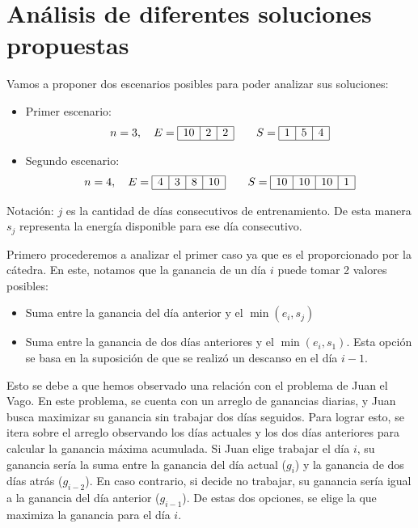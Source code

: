 \section{Análisis de diferentes soluciones propuestas}

Vamos a proponer dos escenarios posibles para poder analizar sus soluciones:

\begin{itemize}
    \item Primer escenario:
    $$
    n = 3,\quad
    E=
    \begin{array}{|c|c|c|}
        \hline 
        10 & 2 & 2\\
        \hline 
    \end{array}
    \qquad
    S=
    \begin{array}{|c|c|c|}
        \hline 
        1 & 5 & 4\\
        \hline 
    \end{array}
    $$

    \item Segundo escenario:
    $$
    n = 4,\quad
    E=
    \begin{array}{|c|c|c|c|}
        \hline 
        4 & 3 & 8 & 10\\
        \hline 
    \end{array}
    \qquad
    S=
    \begin{array}{|c|c|c|c|}
        \hline 
        10 & 10 & 10 & 1\\
        \hline 
    \end{array}
    $$
\end{itemize}

Notación: $j$ es la cantidad de días consecutivos de entrenamiento.
De esta manera $s_j$ representa la energía disponible para ese día consecutivo.

Primero procederemos a analizar el primer caso ya que es el proporcionado por la cátedra. En este,
notamos que la ganancia de un día $i$ puede tomar 2 valores posibles:

\begin{itemize}
    \item Suma entre la ganancia del día anterior y el $\min{(e_i, s_j)}$
    \item Suma entre la ganancia de dos días anteriores y el $\min{(e_i, s_1)}$. Esta opción se basa 
    en la suposición de que se realizó un descanso en el día $i-1$.
\end{itemize}

Esto se debe a que hemos observado una relación con el problema de Juan el Vago. En este problema, se cuenta
con un arreglo de ganancias diarias, y Juan busca maximizar su ganancia sin trabajar dos días seguidos. Para
lograr esto, se itera sobre el arreglo observando los días actuales y los dos días anteriores para calcular
la ganancia máxima acumulada.
Si Juan elige trabajar el día $i$, su ganancia sería la suma entre la ganancia del día actual ($g_i$) y
la ganancia de dos días atrás ($g_{i-2}$). En caso contrario, si decide no trabajar, su ganancia sería igual
a la ganancia del día anterior ($g_{i-1}$). De estas dos opciones, se elige la que maximiza la ganancia para
el día $i$.

